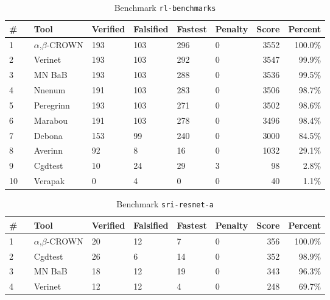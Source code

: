 
\begin{table}[h]
\begin{center}
\caption{Benchmark \texttt{rl-benchmarks}} \label{tab:cat_{cat}}
{\setlength{\tabcolsep}{2pt}
\begin{tabular}[h]{@{}llllllrr@{}}
\toprule
\textbf{\# ~} & \textbf{Tool} & \textbf{Verified} & \textbf{Falsified} & \textbf{Fastest} & \textbf{Penalty} & \textbf{Score} & \textbf{Percent}\\
\midrule
1 & $\alpha$,$\beta$-CROWN & 193 & 103 & 296 & 0 & 3552 & 100.0\% \\
2 & Verinet & 193 & 103 & 292 & 0 & 3547 & 99.9\% \\
3 & MN BaB & 193 & 103 & 288 & 0 & 3536 & 99.5\% \\
4 & Nnenum & 191 & 103 & 283 & 0 & 3506 & 98.7\% \\
5 & Peregrinn & 193 & 103 & 271 & 0 & 3502 & 98.6\% \\
6 & Marabou & 191 & 103 & 278 & 0 & 3496 & 98.4\% \\
7 & Debona & 153 & 99 & 240 & 0 & 3000 & 84.5\% \\
8 & Averinn & 92 & 8 & 16 & 0 & 1032 & 29.1\% \\
9 & Cgdtest & 10 & 24 & 29 & 3 & 98 & 2.8\% \\
10 & Verapak & 0 & 4 & 0 & 0 & 40 & 1.1\% \\
\bottomrule
\end{tabular}
}
\end{center}
\end{table}




\begin{table}[h]
\begin{center}
\caption{Benchmark \texttt{sri-resnet-a}} \label{tab:cat_{cat}}
{\setlength{\tabcolsep}{2pt}
\begin{tabular}[h]{@{}llllllrr@{}}
\toprule
\textbf{\# ~} & \textbf{Tool} & \textbf{Verified} & \textbf{Falsified} & \textbf{Fastest} & \textbf{Penalty} & \textbf{Score} & \textbf{Percent}\\
\midrule
1 & $\alpha$,$\beta$-CROWN & 20 & 12 & 7 & 0 & 356 & 100.0\% \\
2 & Cgdtest & 26 & 6 & 14 & 0 & 352 & 98.9\% \\
3 & MN BaB & 18 & 12 & 19 & 0 & 343 & 96.3\% \\
4 & Verinet & 12 & 12 & 4 & 0 & 248 & 69.7\% \\
\bottomrule
\end{tabular}
}
\end{center}
\end{table}



